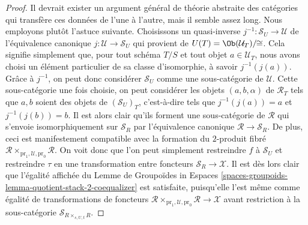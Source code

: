 \begin{proof}
\medskip\noindent
Il devrait exister un argument général de théorie abstraite des catégories
qui transfère ces données de l'une à l'autre, mais il semble
assez long. Nous employons plutôt l'astuce suivante.
Choisissons un quasi-inverse $j^{-1} : \mathcal{S}_U \to \mathcal{U}$
de l'équivalence canonique $j : \mathcal{U} \to \mathcal{S}_U$ qui provient
de $U(T) = \Ob(\mathcal{U}_T)/\!\!\cong$.
Cela signifie simplement que, pour tout schéma $T/S$ et tout
objet $a \in \mathcal{U}_T$, nous avons choisi un
élément particulier de sa classe d'isomorphie, à savoir $j^{-1}(j(a))$.
Grâce à $j^{-1}$, on peut donc considérer $\mathcal{S}_U$
comme une sous-catégorie de $\mathcal{U}$. Cette sous-catégorie une fois choisie,
on peut considérer les objets $(a, b, \alpha)$ de $\mathcal{R}_T$
tels que $a, b$ soient des objets de $(\mathcal{S}_U)_T$, c'est-à-dire tels
que $j^{-1}(j(a)) = a$ et $j^{-1}(j(b)) = b$. Il est alors clair qu'ils
forment une sous-catégorie de $\mathcal{R}$ qui s'envoie isomorphiquement
sur $\mathcal{S}_R$ par l'équivalence canonique
$\mathcal{R} \to \mathcal{S}_R$. De plus, ceci est manifestement compatible
avec la formation du $2$-produit fibré
$\mathcal{R} \times_{\text{pr}_1, \mathcal{U}, \text{pr}_0} \mathcal{R}$.
On voit donc que l'on peut simplement restreindre
$f$ à $\mathcal{S}_U$ et restreindre $\tau$ en une transformation
entre foncteurs $\mathcal{S}_R \to \mathcal{X}$. Il est dès lors clair que
l'égalité affichée du
Lemme de Groupoïdes in Espaces
\ref{spaces-groupoids-lemma-quotient-stack-2-coequalizer}
est satisfaite, puisqu'elle l'est même comme égalité de transformations de foncteurs
$\mathcal{R} \times_{\text{pr}_1, \mathcal{U}, \text{pr}_0} \mathcal{R}
\to \mathcal{X}$ avant restriction à la sous-catégorie
$\mathcal{S}_{R \times_{s, U, t} R}$.


\end{proof}
